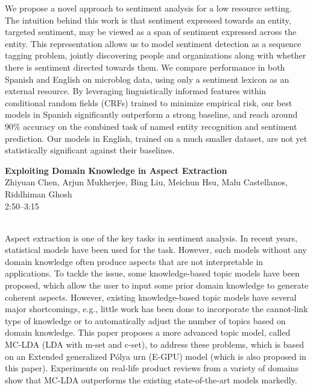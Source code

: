 \documentclass[twoside,makeidx]{book}
\begin{document}
\nopagebreak%
\noindent%
{\small We propose a novel approach to sentiment analysis for a low resource setting. The intuition behind this work is that sentiment expressed towards an entity, targeted sentiment, may be viewed as a span of sentiment expressed across the entity. This representation allows us to model sentiment detection as a sequence tagging problem, jointly discovering people and organizations along with whether there is sentiment directed towards them. We compare performance in both Spanish and English on microblog data, using only a sentiment lexicon as an external resource. By leveraging linguistically informed features within conditional random fields (CRFs) trained to minimize empirical risk, our best models in Spanish significantly outperform a strong baseline, and reach around 90\% accuracy on the combined task of named entity recognition and sentiment prediction. Our models in English, trained on a much smaller dataset, are not yet statistically significant against their baselines.}
\par\vspace{2em}\noindent%
\begin{minipage}{\linewidth}%
\begin{center}
\textbf{\normalsize Exploiting Domain Knowledge in Aspect Extraction}\\
\normalsize  Zhiyuan Chen,  Arjun Mukherjee,  Bing Liu,  Meichun Hsu,  Malu Castellanos,  Riddhiman Ghosh\\
{\small 2:50--3:15}\\
\end{center}
\end{minipage}\\[0.5em]
\nopagebreak%
\noindent%
{\small Aspect extraction is one of the key tasks in sentiment analysis. In recent years, statistical models have been used for the task. However, such models without any domain knowledge often produce aspects that are not interpretable in applications. To tackle the issue, some knowledge-based topic models have been proposed, which allow the user to input some prior domain knowledge to generate coherent aspects. However, existing knowledge-based topic models have several major shortcomings, e.g., little work has been done to incorporate the cannot-link type of knowledge or to automatically adjust the number of topics based on domain knowledge. This paper proposes a more advanced topic model, called MC-LDA (LDA with m-set and c-set), to address these problems, which is based on an Extended generalized P\'{o}lya urn (E-GPU) model (which is also proposed in this paper).  Experiments on real-life product reviews from a variety of domains show that MC-LDA outperforms the existing state-of-the-art models markedly.}
\clearpage
\end{document}
